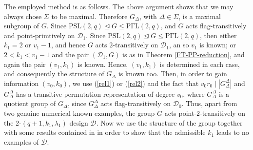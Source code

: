 \documentclass[a4paper,twopage,reqno,12pt]{amsart}
\theoremstyle{definition}
\numberwithin{equation}{section}
\newcommand{\PSL}{\mathrm{PSL}}
\newcommand{\PGaL}{\mathrm{P\Gamma L}}
\renewcommand{\leq}{\leqslant}
\begin{document}
\bigskip
The employed method is as follows. The above argument shows that we may always chose $\Sigma$ to be maximal. Therefore $G_{\Delta}$, with $\Delta \in \Sigma$, is a maximal subgroup of $G$. Since $\PSL(2,q) \unlhd G \leq \PGaL(2,q)$, and $G$ acts flag-transitively and point-primtively on $\mathcal{D}_{1}$. Since $\PSL(2,q) \unlhd G \leq \PGaL(2,q)$, then either $k_{1}=2$ or $v_{1}-1$, and hence $G$ acts $2$-transitively on $\mathcal{D}_{1}$, an so $v_{1}$ is known; or $2<k_{1}<v_{1}-1$ and the pair $(\mathcal{D}_{1},G)$ is as in Theorem \ref{FT-PP-reduction}, and again the pair $(v_{1},k_{1})$ is known. Hence, $(v_{1},k_{1})$ is determined in each case, and consequently the structure of $G_{\Delta}$ is known too. Then, in order to gain information $(v_{0},k_{0})$, we use (\ref{rel1}) or (\ref{rel2}) and the fact that $v_{0}r_{0} \mid \left\vert G_{\Delta}^{\Delta}\right\vert$ and $G_{\Delta}^{\Delta}$ has a transitive permutation representation of degree $v_{0}$, where $G_{\Delta}^{\Delta}$ is a quotient group of $G_{\Delta}$, since $G_{\Delta}^{\Delta}$ acts flag-transitively on $\mathcal{D}_{0}$. Thus, apart from two genuine numerical known examples, the group $G$ acts point-$2$-transitively on the $2$-$(q+1,k_{1},\lambda_{1})$ design $\mathcal{D}$. Now we use the structure of the group together with some results contained in \cite{CZ} in order to show that the admissible $k_{1}$ leads to no examples of $\mathcal{D}$.
\bigskip 
\end{document}

